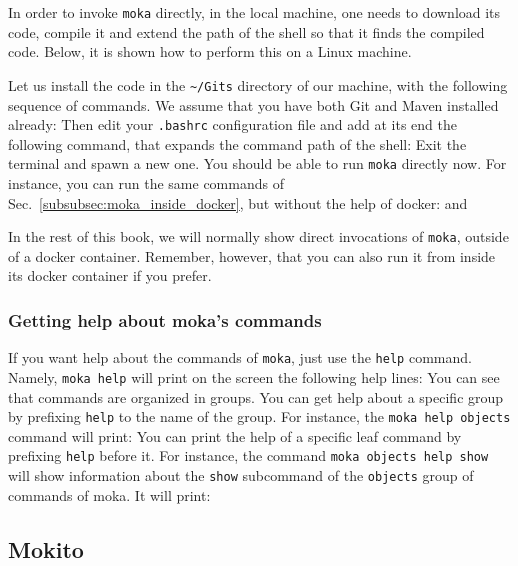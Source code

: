 In order to invoke \texttt{moka} directly, in the local machine, one needs to download
its code, compile it and extend the path of the shell so that it finds the compiled code.
Below, it is shown how to perform this on a Linux machine.

Let us install the code in the \verb|~/Gits| directory of our machine, with the
following sequence of commands. We assume that you have both Git and Maven
installed already:
%
%
Then edit your \texttt{.bashrc} configuration file and add at its end
the following command, that expands the command path of the shell:
%
%
Exit the terminal and spawn a new one. You should be able to run \texttt{moka} directly now.
For instance, you can run the same commands of Sec.~\ref{subsubsec:moka_inside_docker}, but
without the help of docker:
%
%
and
%

In the rest of this book, we will normally show direct invocations
of \texttt{moka}, outside of a docker container.
Remember, however, that you can also run it from inside its docker container if you prefer.

\subsubsection{Getting help about moka's commands}
\label{subsubsec:moka_help}

If you want help about the commands of \texttt{moka}, just use the \texttt{help} command.
Namely, \texttt{moka help} will print on the screen the following help lines:
%
%
You can see that commands are organized in groups. You can get help about a specific
group by prefixing \texttt{help} to the name of the group. For instance, the
\texttt{moka help objects} command will print:
%
%
You can print the help of a specific leaf command by prefixing \texttt{help} before it.
For instance, the command \texttt{moka objects help show} will show information about the
\texttt{show} subcommand of the \texttt{objects} group of commands of moka. It will print:
%

\subsection{Mokito}\label{subsec:mokito}

